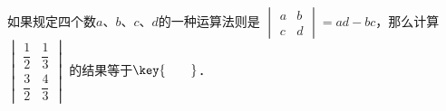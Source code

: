 如果规定四个数$a$、$b$、$c$、$d$的一种运算法则是 
$\begin{vmatrix}
     a & b\\
    c & d
\end{vmatrix}=ad-bc$，那么计算$\begin{vmatrix}
     \dfrac {1}{2} & \dfrac {1}{3}\\
    \dfrac {3}{2} & \dfrac {4}{3}
\end{vmatrix}$  的结果等于$\key{\qquad}$．